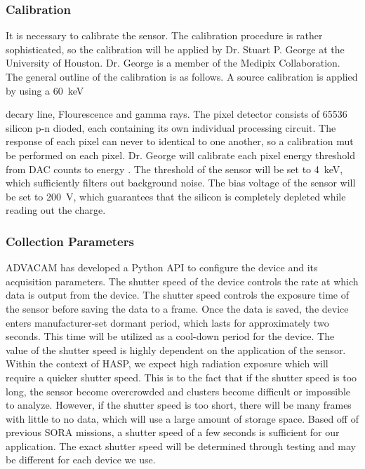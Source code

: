 \subsubsection{Calibration}   
It is necessary to calibrate the sensor. The calibration procedure is rather sophisticated, so the calibration will be applied by Dr. Stuart P. George at the University of Houston. Dr. George is a member of the Medipix Collaboration. The general outline of the calibration is as follows. A source calibration is applied by using a \SI{60}{\keV}{ decary line,  Flourescence and  gamma rays. The pixel detector consists of \num{65536} silicon p-n dioded, each containing its own individual processing circuit. The response of each pixel can never to identical to one another, so a calibration mut be performed on each pixel. Dr. George will calibrate each pixel energy threshold from DAC counts to energy \cite{StuartThesis}. The threshold of the sensor will be set to \SI{4}{\keV}, which sufficiently filters out background noise. The bias voltage of the sensor will be set to \SI{200}{\volt}, which guarantees that the silicon is completely depleted while reading out the charge.
  
\subsubsection{Collection Parameters}
ADVACAM has developed a Python API to configure the device and its acquisition parameters. The shutter speed of the device controls the rate at which data is output from the device. The shutter speed controls the exposure time of the sensor before saving the data to a frame. Once the data is saved, the device enters manufacturer-set dormant period, which lasts for approximately two seconds. This time will be utilized as a cool-down period for the device. The value of the shutter speed is highly dependent on the application of the sensor. Within the context of HASP, we expect high radiation exposure which will require a quicker shutter speed. This is to the fact that if the shutter speed is too long, the sensor become overcrowded and clusters become difficult or impossible to analyze. However, if the shutter speed is too short, there will be many frames with little to no data, which will use a large amount of storage space. Based off of previous SORA missions, a shutter speed of a few seconds is sufficient for our application. The exact shutter speed will be determined through testing and may be different for each device we use.

}
